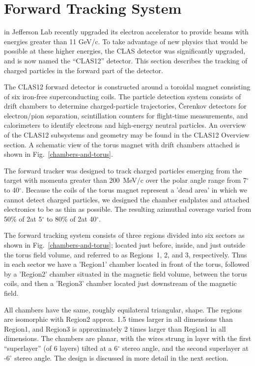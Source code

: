 \section{Forward Tracking System}
\label{overview}

 in
Jefferson Lab recently upgraded its electron accelerator to provide beams with 
energies greater than 11 GeV/c.  To take advantage of new physics that would 
be possible at these higher energies, the CLAS detector was significantly
upgraded, and is now named the ``CLAS12'' detector.  This section describes
the tracking of charged particles in the forward part of the detector.

The CLAS12 forward detector is constructed around a toroidal magnet consisting of six 
iron-free superconducting coils.  The particle detection system consists of drift 
chambers to determine charged-particle trajectories, {\v C}erenkov detectors 
for electron/pion separation, scintillation counters for flight-time 
measurements, and calorimeters to identify electrons and high-energy neutral 
particles.  An overview of the CLAS12 subsystems and geometry may be found in the 
CLAS12 Overview section.  A schematic view of the torus magnet with drift chambers
attached is shown in Fig.~\ref{chambers-and-torus}.  

The forward tracker was designed to track charged particles emerging from the target with
momenta greater than 200~MeV/c over the polar angle range from 7$^{\circ}$ to 
40$^{\circ}$.  Because the coils of the torus magnet represent a 'dead area'
in which we cannot detect charged particles, we designed the chamber endplates
and attached electronics to be as thin as possible.  The resulting azimuthal
coverage varied from 50\% of 2\pi at 5$^{\circ}$ to 80\% of 2\pi at 40$^{\circ}$.

The forward tracking system consists of three regions divided into six
sectors as shown in Fig.~\ref{chambers-and-torus}; located just before, inside, 
and just outside the torus field volume, and referred to as Regions~1, 2, 
and 3, respectively.  Thus in each sector we have a 'Region1' chamber located
in front of the torus, followed by a 'Region2' chamber situated in the magnetic
field volume, between the torus coils, and then a 'Region3' chamber located just
downstream of the magnetic field.

All chambers have the same, roughly equilateral triangular, shape.
The regions are isomorphic with Region2 approx. 1.5 times larger
in all dimensions than Region1, and Region3 is approximately 2 times larger than Region1
in all dimensions.
The chambers are planar, with the wires strung in layer with the first ``superlayer'' (of 6 layers)
tilted at a 6$^\circ$ stereo angle, and the second superlayer at -6$^\circ$ stereo
angle.  The design is discussed in more detail in the next section.

